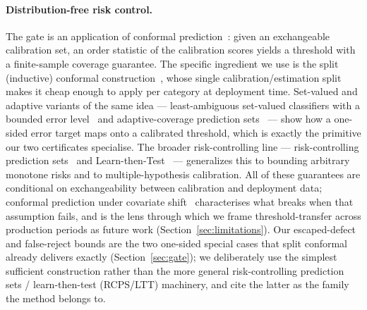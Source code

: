 \documentclass[preprint,11pt]{elsarticle}
\begin{document}
\paragraph{Distribution-free risk control.} The gate is an application of conformal
prediction~\citep{vovk2005algorithmic,lei2018distribution,angelopoulos2023gentle}: given an
exchangeable calibration set, an order statistic of the calibration scores yields a threshold with
a finite-sample coverage guarantee. The specific ingredient we use is the split (inductive)
conformal construction~\citep{papadopoulos2002inductive}, whose single calibration/estimation split
makes it cheap enough to apply per category at deployment time. Set-valued and adaptive variants of
the same idea --- least-ambiguous set-valued classifiers with a bounded error
level~\citep{sadinle2019least} and adaptive-coverage prediction
sets~\citep{romano2020aps} --- show how a one-sided error target maps onto a calibrated threshold,
which is exactly the primitive our two certificates specialise. The broader risk-controlling line
--- risk-controlling prediction sets~\citep{bates2021rcps} and
Learn-then-Test~\citep{angelopoulos2021ltt} --- generalizes this to bounding arbitrary monotone
risks and to multiple-hypothesis calibration. All of these guarantees are conditional on
exchangeability between calibration and deployment data; conformal prediction under covariate
shift~\citep{tibshirani2019covariate} characterises what breaks when that assumption fails, and is
the lens through which we frame threshold-transfer across production periods as future work
(Section~\ref{sec:limitations}). Our escaped-defect and false-reject bounds are the two one-sided
special cases that split conformal already delivers exactly (Section~\ref{sec:gate}); we
deliberately use the simplest sufficient construction rather than the more general
risk-controlling prediction sets / learn-then-test (RCPS/LTT)
machinery, and cite the latter as the family the method belongs to.
\end{document}
